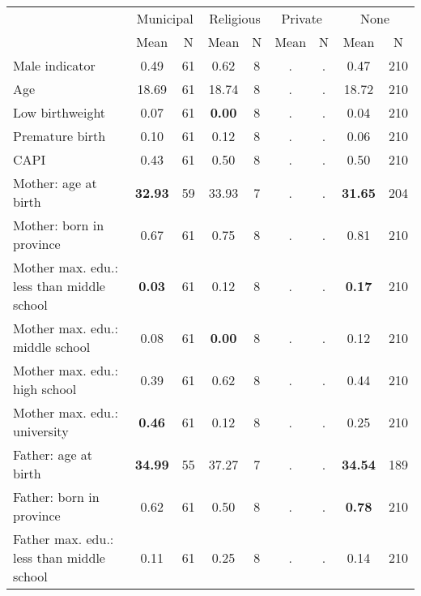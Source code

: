 \begin{tabular}{l c c c c c c c c}
\toprule
& \multicolumn{2}{c}{Municipal} & \multicolumn{2}{c}{Religious} & \multicolumn{2}{c}{Private} & \multicolumn{2}{c}{None} \\
& \scriptsize Mean & \scriptsize N & \scriptsize Mean & \scriptsize N & \scriptsize Mean & \scriptsize N & \scriptsize Mean & \scriptsize N \\
\midrule
Male indicator &      0.49 &        61 &      0.62 &         8 &         . & . &      0.47 &       210 \\
Age &     18.69 &        61 &     18.74 &         8 &         . & . &     18.72 &       210 \\
Low birthweight &      0.07 &        61 & \textbf{     0.00} &         8 &         . & . &      0.04 &       210 \\
Premature birth &      0.10 &        61 &      0.12 &         8 &         . & . &      0.06 &       210 \\
CAPI &      0.43 &        61 &      0.50 &         8 &         . & . &      0.50 &       210 \\
Mother: age at birth & \textbf{    32.93} &        59 &     33.93 &         7 &         . & . & \textbf{    31.65} &       204 \\
Mother: born in province &      0.67 &        61 &      0.75 &         8 &         . & . &      0.81 &       210 \\
Mother max. edu.: less than middle school & \textbf{     0.03} &        61 &      0.12 &         8 &         . & . & \textbf{     0.17} &       210 \\
Mother max. edu.: middle school &      0.08 &        61 & \textbf{     0.00} &         8 &         . & . &      0.12 &       210 \\
Mother max. edu.: high school &      0.39 &        61 &      0.62 &         8 &         . & . &      0.44 &       210 \\
Mother max. edu.: university & \textbf{     0.46} &        61 &      0.12 &         8 &         . & . &      0.25 &       210 \\
Father: age at birth & \textbf{    34.99} &        55 &     37.27 &         7 &         . & . & \textbf{    34.54} &       189 \\
Father: born in province &      0.62 &        61 &      0.50 &         8 &         . & . & \textbf{     0.78} &       210 \\
Father max. edu.: less than middle school &      0.11 &        61 &      0.25 &         8 &         . & . &      0.14 &       210 \\

\end{tabular}
